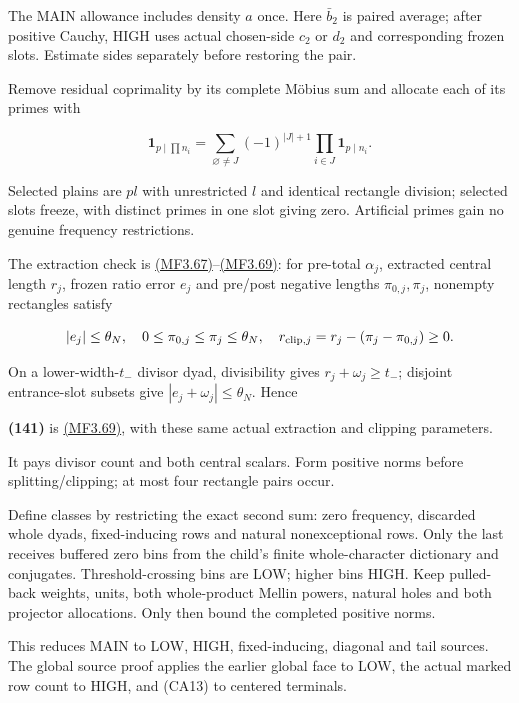 The MAIN allowance includes density \(a\) once. Here \(\bar b_2\) is paired average; after positive Cauchy, HIGH uses actual chosen-side \(c_2\) or \(d_2\) and corresponding frozen slots. Estimate sides separately before restoring the pair.

Remove residual coprimality by its complete Möbius sum and allocate each of its primes with

\[
\mathbf1_{p\mid\prod n_i}
   =\sum_{\varnothing\ne J}(-1)^{|J|+1}
                    \prod_{i\in J}\mathbf1_{p\mid n_i}.
\]

Selected plains are \(pl\) with unrestricted \(l\) and identical rectangle division; selected slots freeze, with distinct primes in one slot giving zero. Artificial primes gain no genuine frequency restrictions.

The extraction check is \protect\hyperlink{mf:eq:B3.67}{(MF3.67)}--\protect\hyperlink{mf:eq:B3.69}{(MF3.69)}: for pre-total \(\alpha_j\), extracted central length \(r_j\), frozen ratio error \(e_j\) and pre/post negative lengths \(\pi_{0,j},\pi_j\), nonempty rectangles satisfy

\[
|e_j|\le\theta_N,\quad 0\le\pi_{0,j}\le\pi_j\le\theta_N,\quad
 r_{{\rm clip},j}=r_j-(\pi_j-\pi_{0,j})\ge0.
\]

On a lower-width-\(t_-\) divisor dyad, divisibility gives \(r_j+\omega_j\ge t_-\); disjoint entrance-slot subsets give \(|e_j+\omega_j|\le\theta_N\). Hence

\hypertarget{sr:extraction-payment}{}

\label{sr:extraction-payment}

\textbf{(141)} is \protect\hyperlink{mf:eq:B3.69}{(MF3.69)}, with these same actual extraction and clipping parameters.

It pays divisor count and both central scalars. Form positive norms before splitting/clipping; at most four rectangle pairs occur.

Define classes by restricting the exact second sum: zero frequency, discarded whole dyads, fixed-inducing rows and natural nonexceptional rows. Only the last receives buffered zero bins from the child's finite whole-character dictionary and conjugates. Threshold-crossing bins are LOW; higher bins HIGH. Keep pulled-back weights, units, both whole-product Mellin powers, natural holes and both projector allocations. Only then bound the completed positive norms.

This reduces MAIN to LOW, HIGH, fixed-inducing, diagonal and tail sources.
The global source proof applies the earlier global face to LOW, the actual
marked row count to HIGH, and (CA13) to centered terminals.

